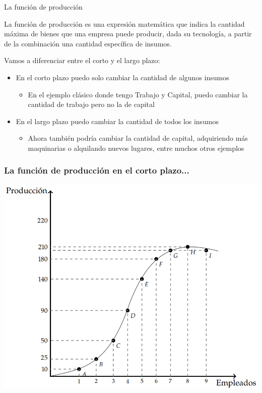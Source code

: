 \documentclass{beamer}
\begin{document}
\begin{frame}{La función de producción}
    \begin{boxA}
        \begin{center}
            La función de producción es una expresión matemática que indica la cantidad máxima de bienes que una empresa puede producir, dada su tecnología, a partir de la combinación una cantidad específica de insumos.
        \end{center}
    \end{boxA}
    Vamos a diferenciar entre el corto y el largo plazo:
    \begin{itemize}
        \item En el corto plazo puedo solo cambiar la cantidad de algunos insumos
        \begin{itemize}
            \item En el ejemplo clásico donde tengo Trabajo y Capital, puedo cambiar la cantidad de trabajo pero no la de capital
        \end{itemize}
        \item En el largo plazo puedo cambiar la cantidad de todos los insumos
        \begin{itemize}
            \item Ahora también podría cambiar la cantidad de capital, adquiriendo más maquinarias o alquilando nuevos lugares, entre muchos otros ejemplos
        \end{itemize}
    \end{itemize}
\end{frame}

\begin{frame}
\frametitle{La función de producción en el corto plazo...}
\centering
\includegraphics[scale=0.5]{../Figures/C12.1.png}
\end{frame}
\end{document}
